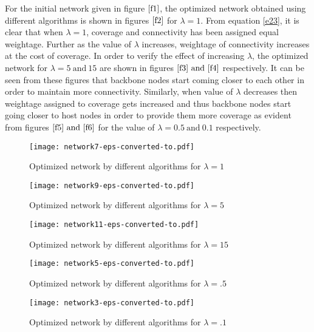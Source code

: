\documentclass[11pt]{article}
\numberwithin{equation}{section}
\begin{document}
For the initial network given in figure $\ref{f1}$, the optimized network obtained using different algorithms is shown in figures $\ref{f2}$ for $\lambda=1.$ From equation \ref{e23}, it is clear that when $\lambda=1$, coverage and connectivity has been assigned equal weightage. Further as the value of $\lambda$ increases, weightage of connectivity increases at the cost of coverage. In order to verify the effect of increasing $\lambda$, the optimized network for $\lambda =5 ~\text{and}~15$ are shown in figures $\ref{f3}~\text{and}~\ref{f4}$ respectively. It can be seen from these figures that backbone nodes start coming closer to each other in order to maintain more connectivity. Similarly, when value of $\lambda$ decreases then weightage assigned to coverage gets increased and thus backbone nodes start going closer to host nodes in order to provide them more coverage as evident from figures $\ref{f5}~\text{and}~\ref{f6}$ for the value of $\lambda =0.5 ~\text{and}~0.1$ respectively.\\

\begin{figure}[htb!]
\begin{center}
\texttt{[image: network7-eps-converted-to.pdf]}
\end{center}
\caption{Optimized network by different algorithms for $ \lambda =1$}\label{f2}
\end{figure}
\begin{figure*}[htb!]
\begin{center}
\texttt{[image: network9-eps-converted-to.pdf]}
\end{center}
\caption{Optimized network by different algorithms for $ \lambda =5$}\label{f3}
\end{figure*}
\begin{figure*}[htb!]
\begin{center}
\texttt{[image: network11-eps-converted-to.pdf]}
\end{center}
\caption{Optimized network by different algorithms for $ \lambda =15 $}\label{f4}
\end{figure*}
\begin{figure*}[htb!]
\begin{center}
\texttt{[image: network5-eps-converted-to.pdf]}
\end{center}
\caption{Optimized network by different algorithms for $ \lambda =.5$}\label{f5}
\end{figure*}
\begin{figure*}[htb!]
\begin{center}
\texttt{[image: network3-eps-converted-to.pdf]}
\end{center}
\caption{Optimized network by different algorithms for $\lambda =.1$}\label{f6}
\end{figure*}
\newpage
\end{document}
